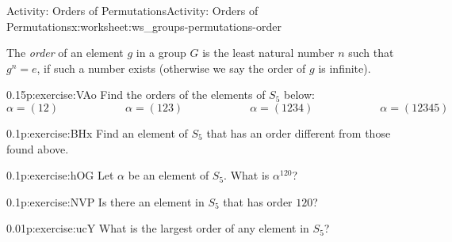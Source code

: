 \documentclass[11pt]{book}
\begin{document}
%
%
\typeout{************************************************}
\typeout{************************************************}
%
\begin{worksheet-subsection}{Activity: Orders of Permutations}{}{Activity: Orders of Permutations}{}{}{x:worksheet:ws_groups-permutations-order}
\begin{introduction}{}%
The \emph{order} of an element \(g\) in a group \(G\) is the least natural number \(n\) such that \(g^n = e\), if such a number exists (otherwise we say the order of \(g\) is infinite).%
\end{introduction}%
\begin{divisionexercise}{1}{}{0.15}{p:exercise:VAo}%
Find the orders of the elements of \(S_5\) below:%
\begin{equation*}
\alpha = (12) \hspace{1in}\alpha = (123) \hspace{1in} \alpha = (1234) \hspace{1in} \alpha = (12345)
\end{equation*}
%
\end{divisionexercise}%
\begin{divisionexercise}{2}{}{0.1}{p:exercise:BHx}%
Find an element of \(S_5\) that has an order different from those found above.%
\end{divisionexercise}%
\begin{divisionexercise}{3}{}{0.1}{p:exercise:hOG}%
Let \(\alpha\) be an element of \(S_5\).  What is \(\alpha^{120}\)?%
\end{divisionexercise}%
\begin{divisionexercise}{4}{}{0.1}{p:exercise:NVP}%
Is there an element in \(S_5\) that has order \(120\)?%
\end{divisionexercise}%
\begin{divisionexercise}{5}{}{0.01}{p:exercise:ucY}%
What is the largest order of any element in \(S_5\)?%
\end{divisionexercise}%
\end{worksheet-subsection}
\restoregeometry
\end{document}
